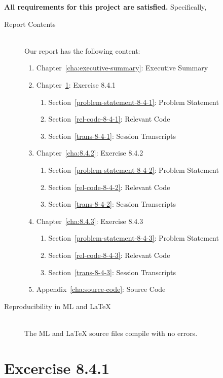 \documentclass{report}
\begin{document}
\textbf{All requirements for this project are satisfied.}
Specifically,
\begin{description}
\item[Report Contents] \ \\
  Our report has the following content:
  \begin{enumerate}[{}]
  \item Chapter~\ref{cha:executive-summary}: Executive Summary
  \item Chapter~\ref{cha:8.4.1}: Exercise 8.4.1
    \begin{enumerate}[{}]
    \item Section~\ref{problem-statement-8-4-1}: Problem Statement
    \item Section~\ref{rel-code-8-4-1}: Relevant Code 
    \item Section~\ref{trans-8-4-1}: Session Transcripts
    \end{enumerate}
  \item Chapter~\ref{cha:8.4.2}: Exercise 8.4.2
    \begin{enumerate}[{}]
    \item Section~\ref{problem-statement-8-4-2}: Problem Statement
    \item Section~\ref{rel-code-8-4-2}: Relevant Code
    \item Section~\ref{trans-8-4-2}: Session Transcripts
    \end{enumerate}
  \item Chapter~\ref{cha:8.4.3}: Exercise 8.4.3
    \begin{enumerate}[{}]
    \item Section~\ref{problem-statement-8-4-3}: Problem Statement
    \item Section~\ref{rel-code-8-4-3}: Relevant Code
    \item Section~\ref{trans-8-4-3}: Session Transcripts
    \end{enumerate}
 \item Appendix~\ref{cha:source-code}: Source Code
  \end{enumerate}
\item[Reproducibility in ML and \LaTeX{}] \ \\
  The ML and \LaTeX{} source files compile with no errors.
\end{description}



\chapter{Excercise 8.4.1}
\label{cha:8.4.1}
\end{document}
